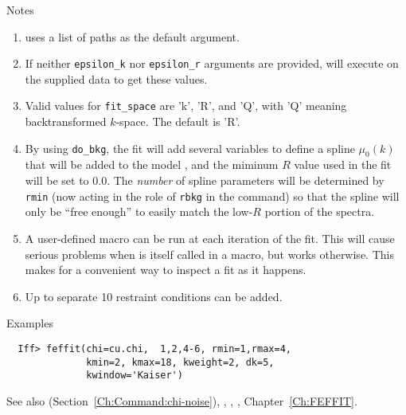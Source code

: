 \begin{IFFcom}
\item[Notes]
  { }
  \begin{enumerate}
  \item {} uses a list of paths as the default argument. 
  \item If neither {\tt{epsilon\_k}} nor {\tt{epsilon\_r}} arguments are
    provided, {} will execute {} on the
    supplied data to get these values.
  \item Valid values for {\tt{fit\_space}} are 'k', 'R', and 'Q', with 'Q' meaning
    backtransformed $k$-space.  The default is 'R'.
  \item By using {\tt{do\_bkg}}, the fit will add several variables to define
    a spline $\mu_0(k)$ that will be added to the model {\chik}, and the
    miminum $R$ value used in the fit will be set to 0.0.  The {\emph{number}}
    of spline parameters will be determined by {\tt{rmin}} (now acting in the
    role of {\tt{rbkg}} in the {} command) so that the spline
    will only be ``free enough'' to easily match the low-$R$ portion of the
    spectra.
  \item A user-defined macro can be run at each iteration of the fit.
    This will cause serious problems when {} is itself called in
    a macro, but works otherwise.  This makes for  a convenient way to
    inspect a fit as it happens.
  \item  Up to separate 10 restraint conditions can be added.
  \end{enumerate}

\item[Examples] {\hspace{0.25truein} \vspace{-0.1truein} \relax }
\begin{verbatim} 
  Iff> feffit(chi=cu.chi,  1,2,4-6, rmin=1,rmax=4,
              kmin=2, kmax=18, kweight=2, dk=5, 
              kwindow='Kaiser')
\end{verbatim}
\item[See also] {} (Section~\ref{Ch:Command:chi-noise}), 
  {}, {},
  {},  Chapter~{\ref{Ch:FEFFIT}}. 
\end{IFFcom}



